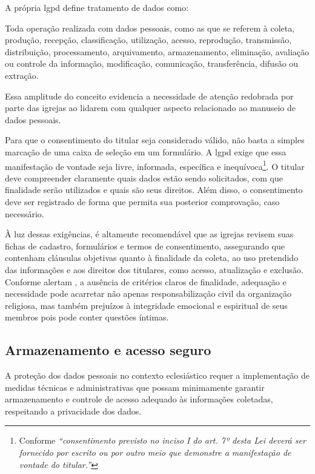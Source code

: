 A própria \gls{lgpd} define tratamento de dados como:

\begin{citacao}
Toda operação realizada com dados pessoais, como as que se referem à coleta, produção, recepção, classificação, utilização, acesso, reprodução, transmissão, distribuição, processamento, arquivamento, armazenamento, eliminação, avaliação ou controle da informação, modificação, comunicação, transferência, difusão ou extração.\cite[Cap.~I, art.~5º, X]{lgpd2018}
\end{citacao}

Essa amplitude do conceito evidencia a necessidade de atenção redobrada por parte das igrejas ao lidarem com qualquer aspecto relacionado ao manuseio de dados pessoais.

Para que o consentimento do titular seja considerado válido, não basta a simples marcação de uma caixa de seleção em um formulário. A \gls{lgpd} exige que essa manifestação de vontade seja livre, informada, específica e inequívoca\footnote{Conforme  \textit{``consentimento previsto no inciso I do art. 7º desta Lei deverá ser fornecido por escrito ou por outro meio que demonstre a manifestação de vontade do titular.''}}. O titular deve compreender claramente quais dados estão sendo solicitados, com que finalidade serão utilizados e quais são seus direitos. Além disso, o consentimento deve ser registrado de forma que permita sua posterior comprovação, caso necessário.

À luz dessas exigências, é altamente recomendável que as igrejas revisem suas fichas de cadastro, formulários e termos de consentimento, assegurando que contenham cláusulas objetivas quanto à finalidade da coleta, ao uso pretendido das informações e aos direitos dos titulares, como acesso, atualização e exclusão. Conforme alertam , a ausência de critérios claros de finalidade, adequação e necessidade pode acarretar não apenas responsabilização civil da organização religiosa, mas também prejuízos à integridade emocional e espiritual de seus membros pois pode conter questões íntimas.

\subsection{Armazenamento e acesso seguro}

A proteção dos dados pessoais no contexto eclesiástico requer a implementação de medidas técnicas e administrativas que possam minimamente garantir armazenamento e controle de acesso adequado às informações coletadas, respeitando a privacidade dos dados.


